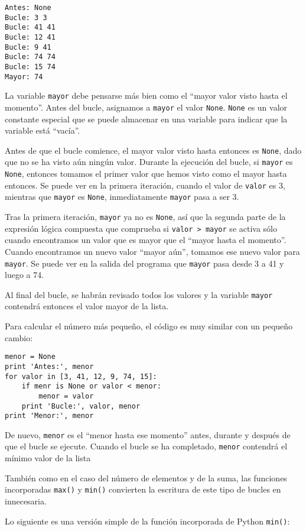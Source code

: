 \beforeverb
\begin{verbatim}
Antes: None
Bucle: 3 3
Bucle: 41 41
Bucle: 12 41
Bucle: 9 41
Bucle: 74 74
Bucle: 15 74
Mayor: 74
\end{verbatim}
\afterverb
%
La variable {\tt mayor} debe pensarse más bien como
el ``mayor valor visto hasta el momento''.
Antes del bucle, asignamos a {\tt mayor} el valor {\tt None}.
{\tt None} es un valor constante especial que se puede
almacenar en una variable para indicar
que la variable está ``vacía''.

Antes de que el bucle comience, el mayor valor visto hasta entonces
es {\tt None}, dado que no se ha visto aún ningún valor. Durante la
ejecución del bucle, si {\tt mayor} es {\tt None}, entonces
tomamos el primer valor que hemos visto como el mayor hasta entonces. Se puede ver en
la primera iteración, cuando el valor de {\tt valor} es 3,
mientras que {\tt mayor} es {\tt None}, inmediatamente
{\tt mayor} pasa a ser 3.

Tras la primera iteración, {\tt mayor} ya no es {\tt None},
así que la segunda parte de la expresión lógica compuesta que comprueba
si {\tt valor > mayor} se activa sólo cuando encontramos un valor que es
mayor que el ``mayor hasta el momento''. Cuando encontramos un nuevo valor ``mayor aún'',
tomamos ese nuevo valor para {\tt mayor}. Se puede ver en la salida
del programa que {\tt mayor} pasa desde 3 a 41 y luego a 74.

Al final del bucle, se habrán revisado todos los valores y la
variable {\tt mayor} contendrá entonces el valor mayor de
la lista.

Para calcular el número más pequeño, el código es muy similar con un
pequeño cambio:

\beforeverb
\begin{verbatim}
menor = None
print 'Antes:', menor
for valor in [3, 41, 12, 9, 74, 15]:
    if menr is None or valor < menor:
        menor = valor
    print 'Bucle:', valor, menor
print 'Menor:', menor
\end{verbatim}
\afterverb
%
De nuevo, {\tt menor} es el ``menor hasta ese momento'' antes, durante y después de
que el bucle se ejecute. Cuando el bucle se ha completado, {\tt menor} contendrá
el mínimo valor de la lista

También como en el caso del número de elementos y de la suma, las funciones incorporadas
{\tt max()} y {\tt min()} convierten la escritura de este tipo de bucles
en innecesaria.

Lo siguiente es una versión simple de la función incorporada de Python
{\tt min()}:

